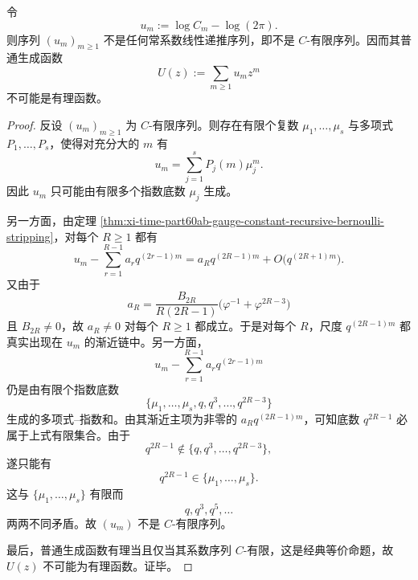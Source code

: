 \begin{theorem}\label{thm:xi-time-part60ab-gauge-constant-non-cfinite-ogf-obstruction}
令
\[
u_m:=\log C_m-\log(2\pi).
\]
则序列 \((u_m)_{m\ge 1}\) 不是任何常系数线性递推序列，即不是 \(C\)-有限序列。因而其普通生成函数
\[
U(z):=\sum_{m\ge 1}u_m z^m
\]
不可能是有理函数。
\end{theorem}
\begin{proof}
反设 \((u_m)_{m\ge 1}\) 为 \(C\)-有限序列。则存在有限个复数 \(\mu_1,\dots,\mu_s\) 与多项式 \(P_1,\dots,P_s\)，使得对充分大的 \(m\) 有
\[
u_m=\sum_{j=1}^{s}P_j(m)\mu_j^m.
\]
因此 \(u_m\) 只可能由有限多个指数底数 \(\mu_j\) 生成。

另一方面，由定理 \ref{thm:xi-time-part60ab-gauge-constant-recursive-bernoulli-stripping}，对每个 \(R\ge 1\) 都有
\[
u_m-\sum_{r=1}^{R-1}a_r q^{(2r-1)m}
=
a_R q^{(2R-1)m}+O\!\bigl(q^{(2R+1)m}\bigr).
\]
又由于
\[
a_R=
\frac{B_{2R}}{R(2R-1)}
\bigl(\varphi^{-1}+\varphi^{2R-3}\bigr)
\]
且 \(B_{2R}\neq 0\)，故 \(a_R\neq 0\) 对每个 \(R\ge 1\) 都成立。于是对每个 \(R\)，尺度 \(q^{(2R-1)m}\) 都真实出现在 \(u_m\) 的渐近链中。另一方面，
\[
u_m-\sum_{r=1}^{R-1}a_r q^{(2r-1)m}
\]
仍是由有限个指数底数
\[
\{\mu_1,\dots,\mu_s,q,q^3,\dots,q^{2R-3}\}
\]
生成的多项式--指数和。由其渐近主项为非零的 \(a_R q^{(2R-1)m}\)，可知底数 \(q^{2R-1}\) 必属于上式有限集合。由于
\[
q^{2R-1}\notin \{q,q^3,\dots,q^{2R-3}\},
\]
遂只能有
\[
q^{2R-1}\in \{\mu_1,\dots,\mu_s\}.
\]
这与 \(\{\mu_1,\dots,\mu_s\}\) 有限而
\[
q,q^3,q^5,\dots
\]
两两不同矛盾。故 \((u_m)\) 不是 \(C\)-有限序列。

最后，普通生成函数有理当且仅当其系数序列 \(C\)-有限，这是经典等价命题，故 \(U(z)\) 不可能为有理函数。证毕。
\end{proof}

